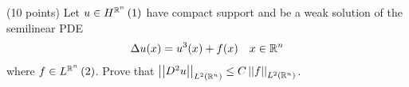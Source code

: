 (10 points)
Let $u \in \sobolevh{1}{\reals^n}$ have compact support and be a weak solution
of the semilinear PDE
\begin{align*}
  \lapl u(x) = u^3(x) + f(x) & & x \in \reals^n
\end{align*}
where $f \in \lnfunc{2}{\reals^n}$.
Prove that $\lnorm{\grad^2 u}{2}{\reals^n} \leq C \lnorm{f}{2}{\reals^n}$.
